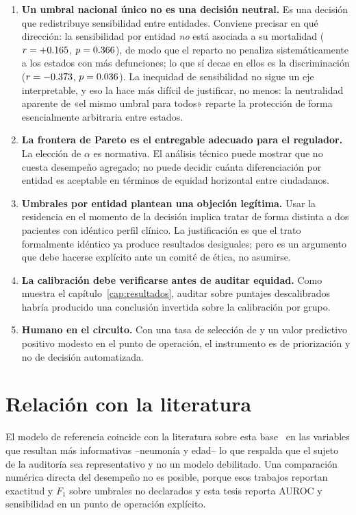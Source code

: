 \begin{enumerate}[leftmargin=*]
  \item \textbf{Un umbral nacional único no es una decisión neutral.} Es una
    decisión que redistribuye sensibilidad entre entidades. Conviene precisar en qué
    dirección: la sensibilidad por entidad \emph{no} está asociada a su mortalidad
    ($r=+0.165$, $p=0.366$), de modo que el reparto no penaliza
    sistemáticamente a los estados con más defunciones; lo que sí decae en ellos es
    la discriminación ($r=-0.373$, $p=0.036$). La inequidad de
    sensibilidad no sigue un eje interpretable, y eso la hace más difícil de
    justificar, no menos: la neutralidad aparente de «el mismo umbral para todos»
    reparte la protección de forma esencialmente arbitraria entre estados.
  \item \textbf{La frontera de Pareto es el entregable adecuado para el
    regulador.} La elección de $\alpha$ es normativa. El análisis técnico puede
    mostrar que no cuesta desempeño agregado; no puede decidir cuánta
    diferenciación por entidad es aceptable en términos de equidad horizontal
    entre ciudadanos.
  \item \textbf{Umbrales por entidad plantean una objeción legítima.} Usar la
    residencia en el momento de la decisión implica tratar de forma distinta a dos
    pacientes con idéntico perfil clínico. La justificación es que el trato
    formalmente idéntico ya produce resultados desiguales; pero es un argumento que
    debe hacerse explícito ante un comité de ética, no asumirse.
  \item \textbf{La calibración debe verificarse antes de auditar equidad.} Como
    muestra el capítulo~\ref{cap:resultados}, auditar sobre puntajes descalibrados
    habría producido una conclusión invertida sobre la calibración por grupo.
  \item \textbf{Humano en el circuito.} Con una tasa de selección de \selGlobal{} y un
    valor predictivo positivo modesto en el punto de operación, el instrumento es
    de priorización y no de decisión automatizada.
\end{enumerate}

\section{Relación con la literatura}

El modelo de referencia coincide con la literatura sobre esta
base~\parencite{becerra2022,mendez2024} en las variables que resultan más
informativas --neumonía y edad-- lo que respalda que el sujeto de la auditoría sea
representativo y no un modelo debilitado. Una comparación numérica directa del
desempeño no es posible, porque esos trabajos reportan exactitud y $F_1$ sobre
umbrales no declarados y esta tesis reporta AUROC y sensibilidad en un punto de
operación explícito.

